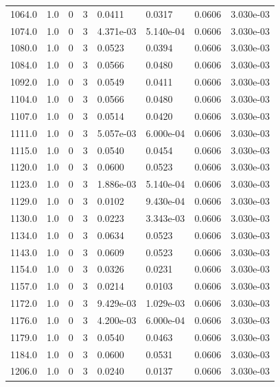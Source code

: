 \documentclass[preview]{standalone}
\begin{document}
{{{{{{{\begin{tabular}{L{1.2cm}C{1.2cm} C{0.3cm}C{0.5cm} C{1.4cm}C{1.4cm} C{1.4cm}C{1.4cm}}
  1064.0  &   1.0  & 0     &  3 &  0.0411  & 0.0317  & 0.0606 &  3.030e-03   \\ 
  1074.0  &   1.0  & 0     &  3 &  4.371e-03  & 5.140e-04  & 0.0606 &  3.030e-03   \\ 
  1080.0  &   1.0  & 0     &  3 &  0.0523  & 0.0394  & 0.0606 &  3.030e-03   \\ 
  1084.0  &   1.0  & 0     &  3 &  0.0566  & 0.0480  & 0.0606 &  3.030e-03   \\ 
  1092.0  &   1.0  & 0     &  3 &  0.0549  & 0.0411  & 0.0606 &  3.030e-03   \\ 
  1104.0  &   1.0  & 0     &  3 &  0.0566  & 0.0480  & 0.0606 &  3.030e-03   \\ 
  1107.0  &   1.0  & 0     &  3 &  0.0514  & 0.0420  & 0.0606 &  3.030e-03   \\ 
  1111.0  &   1.0  & 0     &  3 &  5.057e-03  & 6.000e-04  & 0.0606 &  3.030e-03   \\ 
  1115.0  &   1.0  & 0     &  3 &  0.0540  & 0.0454  & 0.0606 &  3.030e-03   \\ 
  1120.0  &   1.0  & 0     &  3 &  0.0600  & 0.0523  & 0.0606 &  3.030e-03   \\ 
  1123.0  &   1.0  & 0     &  3 &  1.886e-03  & 5.140e-04  & 0.0606 &  3.030e-03   \\ 
  1129.0  &   1.0  & 0     &  3 &  0.0102  & 9.430e-04  & 0.0606 &  3.030e-03   \\ 
  1130.0  &   1.0  & 0     &  3 &  0.0223  & 3.343e-03  & 0.0606 &  3.030e-03   \\ 
  1134.0  &   1.0  & 0     &  3 &  0.0634  & 0.0523  & 0.0606 &  3.030e-03   \\ 
  1143.0  &   1.0  & 0     &  3 &  0.0609  & 0.0523  & 0.0606 &  3.030e-03   \\ 
  1154.0  &   1.0  & 0     &  3 &  0.0326  & 0.0231  & 0.0606 &  3.030e-03   \\ 
  1157.0  &   1.0  & 0     &  3 &  0.0214  & 0.0103  & 0.0606 &  3.030e-03   \\ 
  1172.0  &   1.0  & 0     &  3 &  9.429e-03  & 1.029e-03  & 0.0606 &  3.030e-03   \\ 
  1176.0  &   1.0  & 0     &  3 &  4.200e-03  & 6.000e-04  & 0.0606 &  3.030e-03   \\ 
  1179.0  &   1.0  & 0     &  3 &  0.0540  & 0.0463  & 0.0606 &  3.030e-03   \\ 
  1184.0  &   1.0  & 0     &  3 &  0.0600  & 0.0531  & 0.0606 &  3.030e-03   \\ 
  1206.0  &   1.0  & 0     &  3 &  0.0240  & 0.0137  & 0.0606 &  3.030e-03   \\ 

\end{tabular}}}}}}}}
\end{document}
